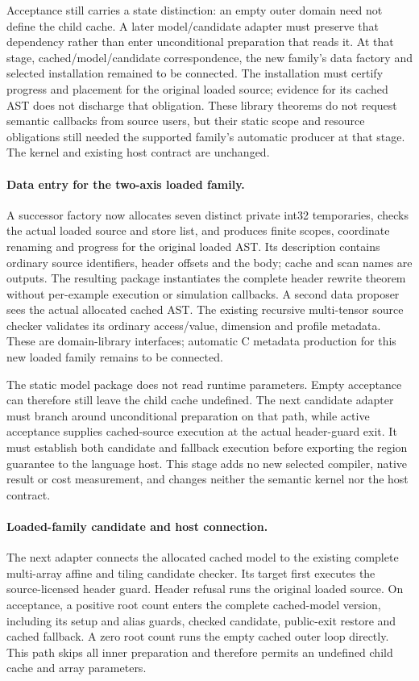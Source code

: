 Acceptance still carries a state distinction: an empty outer domain need
not define the child cache. A later model/candidate adapter must preserve
that dependency rather than enter unconditional preparation that reads it.
At that stage, cached/model/candidate correspondence, the new family's
data factory and selected installation remained to be connected. The installation must certify
progress and placement for the original loaded source; evidence for its
cached AST does not discharge that obligation.
These library theorems do not request semantic callbacks from source users,
but their static scope and resource obligations still needed the supported
family's automatic producer at that stage. The kernel and existing host contract are
unchanged.

\paragraph{Data entry for the two-axis loaded family.}
A successor factory now allocates seven distinct private int32 temporaries,
checks the actual loaded source and store list, and produces finite scopes,
coordinate renaming and progress for the original loaded AST. Its description
contains ordinary source identifiers, header offsets and the body; cache and
scan names are outputs. The resulting package instantiates the complete header
rewrite theorem without per-example execution or simulation callbacks.
A second data proposer sees the actual allocated cached AST. The existing
recursive multi-tensor source checker validates its ordinary access/value,
dimension and profile metadata. These are domain-library interfaces; automatic
C metadata production for this new loaded family remains to be connected.

The static model package does not read runtime parameters. Empty acceptance
can therefore still leave the child cache undefined. The next candidate adapter
must branch around unconditional preparation on that path, while active
acceptance supplies cached-source execution at the actual header-guard exit.
It must establish both candidate and fallback execution before exporting the
region guarantee to the language host. This stage adds no new selected
compiler, native result or cost measurement, and changes neither the semantic
kernel nor the host contract.

\paragraph{Loaded-family candidate and host connection.}
The next adapter connects the allocated cached model to the existing complete
multi-array affine and tiling candidate checker. Its target first executes the
source-licensed header guard. Header refusal runs the original loaded source.
On acceptance, a positive root count enters the complete cached-model version,
including its setup and alias guards, checked candidate, public-exit restore
and cached fallback. A zero root count runs the empty cached outer loop
directly. This path skips all inner preparation and therefore permits an
undefined child cache and array parameters.

